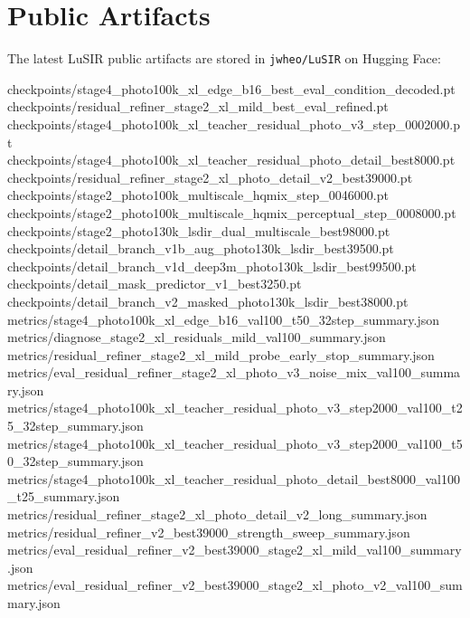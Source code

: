\documentclass[
  10pt,
]{article}
\newenvironment{Shaded}{}{}
\newcommand{\NormalTok}[1]{#1}
\begin{document}
\hypertarget{public-artifacts}{%
\section{Public Artifacts}\label{public-artifacts}}

The latest LuSIR public artifacts are stored in \texttt{jwheo/LuSIR} on
Hugging Face:

\begin{Shaded}
\begin{Highlighting}[]
\NormalTok{checkpoints/stage4\_photo100k\_xl\_edge\_b16\_best\_eval\_condition\_decoded.pt}
\NormalTok{checkpoints/residual\_refiner\_stage2\_xl\_mild\_best\_eval\_refined.pt}
\NormalTok{checkpoints/stage4\_photo100k\_xl\_teacher\_residual\_photo\_v3\_step\_0002000.pt}
\NormalTok{checkpoints/stage4\_photo100k\_xl\_teacher\_residual\_photo\_detail\_best8000.pt}
\NormalTok{checkpoints/residual\_refiner\_stage2\_xl\_photo\_detail\_v2\_best39000.pt}
\NormalTok{checkpoints/stage2\_photo100k\_multiscale\_hqmix\_step\_0046000.pt}
\NormalTok{checkpoints/stage2\_photo100k\_multiscale\_hqmix\_perceptual\_step\_0008000.pt}
\NormalTok{checkpoints/stage2\_photo130k\_lsdir\_dual\_multiscale\_best98000.pt}
\NormalTok{checkpoints/detail\_branch\_v1b\_aug\_photo130k\_lsdir\_best39500.pt}
\NormalTok{checkpoints/detail\_branch\_v1d\_deep3m\_photo130k\_lsdir\_best99500.pt}
\NormalTok{checkpoints/detail\_mask\_predictor\_v1\_best3250.pt}
\NormalTok{checkpoints/detail\_branch\_v2\_masked\_photo130k\_lsdir\_best38000.pt}
\NormalTok{metrics/stage4\_photo100k\_xl\_edge\_b16\_val100\_t50\_32step\_summary.json}
\NormalTok{metrics/diagnose\_stage2\_xl\_residuals\_mild\_val100\_summary.json}
\NormalTok{metrics/residual\_refiner\_stage2\_xl\_mild\_probe\_early\_stop\_summary.json}
\NormalTok{metrics/eval\_residual\_refiner\_stage2\_xl\_photo\_v3\_noise\_mix\_val100\_summary.json}
\NormalTok{metrics/stage4\_photo100k\_xl\_teacher\_residual\_photo\_v3\_step2000\_val100\_t25\_32step\_summary.json}
\NormalTok{metrics/stage4\_photo100k\_xl\_teacher\_residual\_photo\_v3\_step2000\_val100\_t50\_32step\_summary.json}
\NormalTok{metrics/stage4\_photo100k\_xl\_teacher\_residual\_photo\_detail\_best8000\_val100\_t25\_summary.json}
\NormalTok{metrics/residual\_refiner\_stage2\_xl\_photo\_detail\_v2\_long\_summary.json}
\NormalTok{metrics/residual\_refiner\_v2\_best39000\_strength\_sweep\_summary.json}
\NormalTok{metrics/eval\_residual\_refiner\_v2\_best39000\_stage2\_xl\_mild\_val100\_summary.json}
\NormalTok{metrics/eval\_residual\_refiner\_v2\_best39000\_stage2\_xl\_photo\_v2\_val100\_summary.json}

\end{Highlighting}
\end{Shaded}
\end{document}
